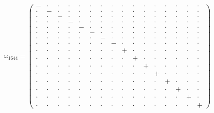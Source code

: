 \documentclass[
  10pt,
]{article}
\begin{document}
\[\omega_{1644}=\left(\begin{smallmatrix} - & \cdot & \cdot & \cdot & \cdot & \cdot & \cdot & \cdot & \cdot & \cdot & \cdot & \cdot & \cdot & \cdot & \cdot & \cdot \\ \cdot & - & \cdot & \cdot & \cdot & \cdot & \cdot & \cdot & \cdot & \cdot & \cdot & \cdot & \cdot & \cdot & \cdot & \cdot \\ \cdot & \cdot & - & \cdot & \cdot & \cdot & \cdot & \cdot & \cdot & \cdot & \cdot & \cdot & \cdot & \cdot & \cdot & \cdot \\ \cdot & \cdot & \cdot & - & \cdot & \cdot & \cdot & \cdot & \cdot & \cdot & \cdot & \cdot & \cdot & \cdot & \cdot & \cdot \\ \cdot & \cdot & \cdot & \cdot & - & \cdot & \cdot & \cdot & \cdot & \cdot & \cdot & \cdot & \cdot & \cdot & \cdot & \cdot \\ \cdot & \cdot & \cdot & \cdot & \cdot & - & \cdot & \cdot & \cdot & \cdot & \cdot & \cdot & \cdot & \cdot & \cdot & \cdot \\ \cdot & \cdot & \cdot & \cdot & \cdot & \cdot & - & \cdot & \cdot & \cdot & \cdot & \cdot & \cdot & \cdot & \cdot & \cdot \\ \cdot & \cdot & \cdot & \cdot & \cdot & \cdot & \cdot & - & \cdot & \cdot & \cdot & \cdot & \cdot & \cdot & \cdot & \cdot \\ \cdot & \cdot & \cdot & \cdot & \cdot & \cdot & \cdot & \cdot & + & \cdot & \cdot & \cdot & \cdot & \cdot & \cdot & \cdot \\ \cdot & \cdot & \cdot & \cdot & \cdot & \cdot & \cdot & \cdot & \cdot & + & \cdot & \cdot & \cdot & \cdot & \cdot & \cdot \\ \cdot & \cdot & \cdot & \cdot & \cdot & \cdot & \cdot & \cdot & \cdot & \cdot & + & \cdot & \cdot & \cdot & \cdot & \cdot \\ \cdot & \cdot & \cdot & \cdot & \cdot & \cdot & \cdot & \cdot & \cdot & \cdot & \cdot & + & \cdot & \cdot & \cdot & \cdot \\ \cdot & \cdot & \cdot & \cdot & \cdot & \cdot & \cdot & \cdot & \cdot & \cdot & \cdot & \cdot & + & \cdot & \cdot & \cdot \\ \cdot & \cdot & \cdot & \cdot & \cdot & \cdot & \cdot & \cdot & \cdot & \cdot & \cdot & \cdot & \cdot & + & \cdot & \cdot \\ \cdot & \cdot & \cdot & \cdot & \cdot & \cdot & \cdot & \cdot & \cdot & \cdot & \cdot & \cdot & \cdot & \cdot & + & \cdot \\ \cdot & \cdot & \cdot & \cdot & \cdot & \cdot & \cdot & \cdot & \cdot & \cdot & \cdot & \cdot & \cdot & \cdot & \cdot & + \end{smallmatrix}\right)\qquad
\]
\end{document}
